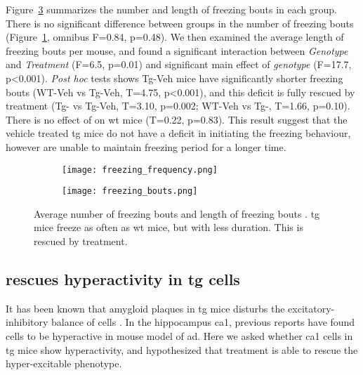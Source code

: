 Figure~\ref{f.ad.freezing_profile} summarizes the number and length of freezing bouts in each group. There is no significant difference between groups in the number of freezing bouts (Figure~\ref{f.ad.freezing_freq}, omnibus F=0.84, p=0.48). We then examined the average length of freezing bouts per mouse, and found a significant interaction between \textit{Genotype} and \textit{Treatment} (F=6.5, p=0.01) and significant main effect of \textit{genotype} (F=17.7, p<0.001). \textit{Post hoc} tests shows Tg-Veh mice have significantly shorter freezing bouts (WT-Veh vs Tg-Veh, T=4.75, p<0.001), and this deficit is fully rescued by \tglu{} treatment (Tg-\glu{} vs Tg-Veh, T=3.10, p=0.002; WT-Veh vs Tg-\glu, T=1.66, p=0.10). There is no effect of \tglu{} on \gls{wt} mice (T=0.22, p=0.83). This result suggest that the vehicle treated \gls{tg} mice do not have a deficit in initiating the freezing behaviour, however are unable to maintain freezing period for a longer time. 

\begin{figure}[h]
    \begin{subfigure}[h]{\textwidth}
        \texttt{[image: freezing\_frequency.png]}
        \caption{\label{f.ad.freezing_freq}}
    \end{subfigure}
    \begin{subfigure}[h]{\textwidth}
        \texttt{[image: freezing\_bouts.png]}
        \caption{\label{f.ad.freezing_bouts}}
    \end{subfigure}
    \caption[Freezing lengths and number of freezing bouts.]{Average number of freezing bouts  and length of freezing bouts . \Gls{tg} mice freeze as often as \gls{wt} mice, but with less duration. This is rescued by \tglu{} treatment. \label{f.ad.freezing_profile}}
\end{figure}


\subsection{\tglu{} rescues hyperactivity in \gls{tg} cells}

It has been known that amygloid plaques in \gls{tg} mice disturbs the excitatory-inhibitory balance of cells \citep{palop16}. In the hippocampus \gls{ca1}, previous reports have found cells to be hyperactive in mouse model of \gls{ad}. Here we asked whether \gls{ca1} cells in \gls{tg} mice show hyperactivity, and hypothesized that \tglu{} treatment is able to rescue the hyper-excitable phenotype.

